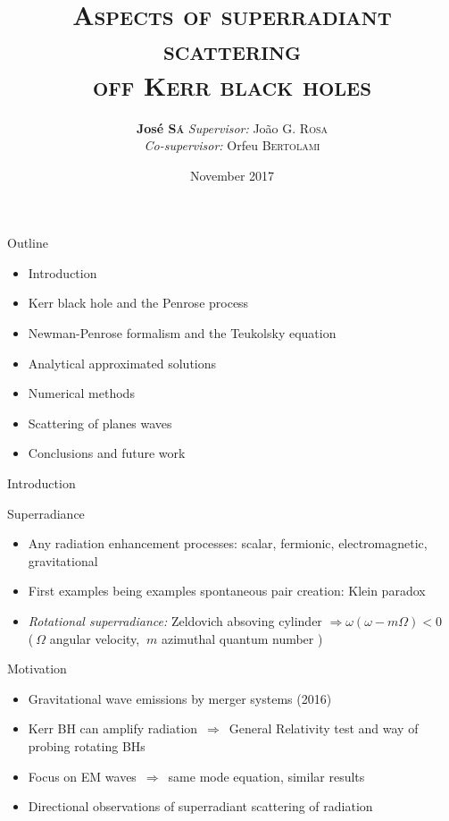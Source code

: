 \documentclass[9pt]{beamer}
\title{\scshape\huge Aspects of superradiant scattering\\off Kerr black holes}
\date{\normalsize November 2017}
\author{\large\textbf{José \textsc{Sá}} \hfill \textit{Supervisor:} João G. \textsc{Rosa} \\[0.15cm] \phantom{arg} \hfill \textit{Co-supervisor:} Orfeu \textsc{Bertolami} \\[0.4cm]}
\institute{\small Faculdade de Ciências da Universidade do Porto}
\begin{document}
\maketitle


\begin{frame}[fragile]{Outline}
    \begin{itemize}
        \large
        \setlength\itemsep{1.6em}
        \item Introduction
        \item Kerr black hole and the Penrose process
        \item Newman-Penrose formalism and the Teukolsky equation
        \item Analytical approximated solutions
        \item Numerical methods
        \item Scattering of planes waves 
        \item Conclusions and future work
    \end{itemize}
\end{frame}


\begin{frame}[fragile]{Introduction}
	\begin{block}{Superradiance}
		\begin{itemize}
			\setlength\itemsep{1em}
			
			\item Any radiation enhancement processes: scalar, fermionic, electromagnetic, gravitational
			
			\item First examples being examples spontaneous pair creation: Klein paradox 
			
			\item \emph{Rotational superradiance:} Zeldovich absoving cylinder $\Rightarrow \omega(\omega - m \Omega) < 0$\\
			{\small ($~\Omega$ angular velocity, $~m$ azimuthal quantum number )}
		\end{itemize}
	\end{block}
	\begin{block}{Motivation}
		\begin{itemize}
			\setlength\itemsep{1em}
			\item Gravitational wave emissions by merger systems (2016)
			\item Kerr BH can amplify radiation $\,\Rightarrow\,$ General Relativity test and way of probing rotating BHs
			\item Focus on EM waves $\,\Rightarrow\,$ same mode equation, similar results
			\item Directional observations of superradiant scattering of radiation
		\end{itemize}
	\end{block}
\end{frame}
\end{document}
